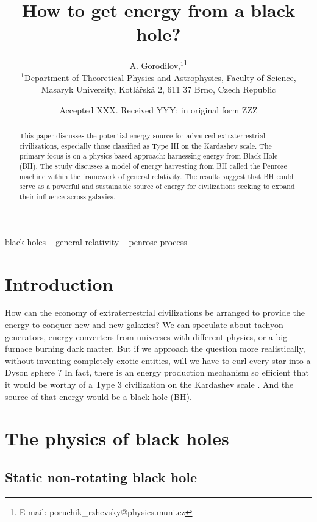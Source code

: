 \documentclass[fleqn,usenatbib]{mnras}
\title[How to get energy from a black hole?]{How to get energy from a black hole?}
\author[A. Gorodilov]{
A. Gorodilov,$^{1}$\thanks{E-mail: poruchik\_rzhevsky@physics.muni.cz}
\\
$^{1}$Department of Theoretical Physics and Astrophysics, Faculty of Science, Masaryk University, Kotlářská 2, 611 37 Brno, Czech Republic
}
\date{Accepted XXX. Received YYY; in original form ZZZ}
\begin{document}
\label{firstpage}
\pagerange{\pageref{firstpage}--\pageref{lastpage}}
\maketitle

\begin{abstract}
This paper discusses the potential energy source for advanced extraterrestrial civilizations, especially those classified as Type III on the Kardashev scale. The primary focus is on a physics-based approach: harnessing energy from Black Hole (BH). The study discusses a model of energy harvesting from BH called the Penrose machine within the framework of general relativity. The results suggest that BH could serve as a powerful and sustainable source of energy for civilizations seeking to expand their influence across galaxies.
\end{abstract}


\begin{keywords}
black holes -- general relativity -- penrose process
\end{keywords}



\section{Introduction}

How can the economy of extraterrestrial civilizations be arranged to provide the energy to conquer new and new galaxies? We can speculate about tachyon generators, energy converters from universes with different physics, or a big furnace burning dark matter. But if we approach the question more realistically, without inventing completely exotic entities, will we have to curl every star into a Dyson sphere \citet{dyson1960}? In fact, there is an energy production mechanism so efficient that it would be worthy of a Type 3 civilization on the Kardashev scale \citet{kardashev1964}. And the source of that energy would be a black hole (BH).

\section{The physics of black holes}

\subsection{Static non-rotating black hole}
\end{document}
